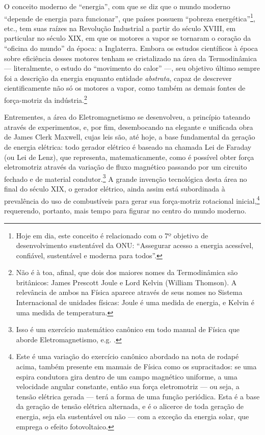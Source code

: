 O conceito moderno de ``energia'', com que se diz que o mundo moderno ``depende de energia para funcionar'', que países possuem ``pobreza energética''\footnote{Hoje em dia, este conceito é relacionado com o 7º objetivo de desenvolvimento sustentável da ONU: ``Assegurar acesso a energia acessível, confiável, sustentável e moderna para todos''.}, etc., tem suas raízes na Revolução Industrial a partir do século XVIII, em particular no século XIX, em que os motores a vapor se tornaram o coração da ``oficina do mundo'' da época: a Inglaterra. Embora os estudos científicos à época sobre eficiência desses motores tenham se cristalizado na área da Termodinâmica --- literalmente, o estudo do ``movimento do calor'' ---, seu objetivo último sempre foi a descrição da energia enquanto entidade \emph{abstrata}, capaz de descrever cientificamente não só os motores a vapor, como também as demais fontes de força-motriz da indústria.\footnote{Não é à toa, afinal, que dois dos maiores nomes da Termodinâmica são britânicos: James Prescott Joule e Lord Kelvin (William Thomson). A relevância de ambos na Física aparece através de seus nomes no Sistema Internacional de unidades físicas: Joule é uma medida de energia, e Kelvin é uma medida de temperatura.}

Entrementes, a área do Eletromagnetismo se desenvolveu, a princípio tateando através de experimentos, e, por fim, desembocando na elegante e unificada obra de James Clerk Maxwell, cujas leis são, até hoje, a base fundamental da geração de energia elétrica: todo gerador elétrico é baseado na chamada Lei de Faraday (ou Lei de Lenz), que representa, matematicamente, como é possível obter força eletromotriz através da variação de fluxo magnético passando por um circuito fechado e de material condutor.\footnote{Isso é um exercício matemático canônico em todo manual de Física que aborde Eletromagnetismo, e.g. \textcites[pp. 312--321]{Griffiths2013}[pp. 67--71]{TongElectromag}.} A grande invenção tecnológica desta área no final do século XIX, o gerador elétrico, ainda assim está subordinada à prevalência do uso de combustíveis para gerar sua força-motriz rotacional inicial,\footnote{Este é uma variação do exercício canônico abordado na nota de rodapé acima, também presente em manuais de Física como os supracitados: se uma espira condutora gira dentro de um campo magnético uniforme, a uma velocidade angular constante, então sua força eletromotriz --- ou seja, a tensão elétrica gerada --- terá a forma de uma função periódica. Esta é a base da geração de tensão elétrica alternada, e é o alicerce de toda geração de energia, seja ela sustentável ou não --- com a exceção da energia solar, que emprega o efeito fotovoltaico.} requerendo, portanto, mais tempo para figurar no centro do mundo moderno.

